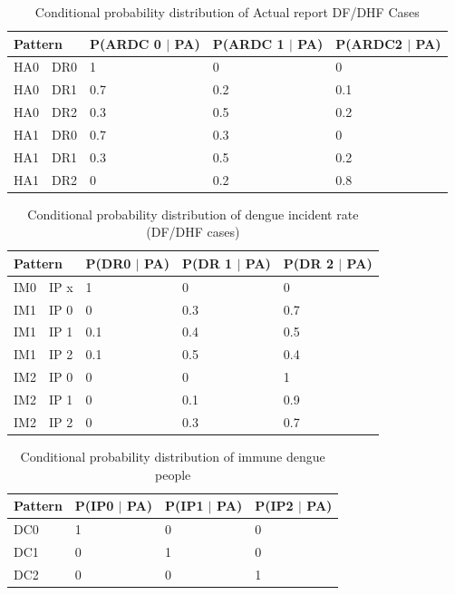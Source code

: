 \documentclass[review]{elsarticle}
\begin{document}
	\begin{table}[!htbp]
		\centering
		\normalsize
		\begin{tabular}{|l|l|l|l|l|}
			\hline
			\multicolumn{2}{|l|}{Pattern}  & P(ARDC 0 $\mid$ PA) & P(ARDC 1 $\mid$ PA) & P(ARDC2 $\mid$ PA)\\
			\hline
			HA0 & DR0 & 1 & 0 & 0\\
			\hline
			HA0 & DR1 & 0.7 & 0.2 & 0.1\\
			\hline
			HA0 & DR2 & 0.3 & 0.5 & 0.2\\
			\hline
			HA1 & DR0 & 0.7 & 0.3 & 0\\
			\hline
			HA1 & DR1 & 0.3 & 0.5 & 0.2\\
			\hline
			HA1 & DR2 & 0 & 0.2 & 0.8\\
			\hline
		\end{tabular}
		\caption{Conditional probability distribution of Actual report DF/DHF Cases}
	    \label{condition-dh}
	\end{table}
	
	\begin{table}[!htbp]
		\centering
		\normalsize
		\begin{tabular}{|l|l|l|l|l|}
			\hline
			\multicolumn{2}{|l|}{Pattern}   & P(DR0 $\mid$  PA) & P(DR 1 $\mid$  PA) & P(DR 2 $\mid$  PA)\\
			\hline
			IM0 & IP x & 1 & 0 & 0\\
			\hline
			IM1 & IP 0 & 0 & 0.3 & 0.7\\
			\hline
			IM1 & IP 1 & 0.1 & 0.4 & 0.5\\
			\hline
			IM1 & IP 2 & 0.1 & 0.5 & 0.4\\
			\hline
			IM2 & IP 0 & 0 & 0 & 1\\
			\hline
			IM2 & IP 1 & 0 & 0.1 & 0.9\\
			\hline
			IM2 & IP 2 & 0 & 0.3 & 0.7\\
			\hline
		\end{tabular}
		\caption{Conditional probability distribution of dengue incident rate (DF/DHF cases)}
		\label{condition-rdh}
	\end{table}
	
	\begin{table}[!htbp]
		\centering
		\normalsize
		\begin{tabular}{|l|l|l|l|}
			\hline
			Pattern & P(IP0 $\mid$ PA) & P(IP1 $\mid$ PA) & P(IP2 $\mid$ PA)\\
			\hline
			DC0 & 1 & 0 & 0\\
			\hline
			DC1 & 0 & 1 & 0\\
			\hline
			DC2 & 0 & 0 & 1\\
			\hline
		\end{tabular}
		\caption{Conditional probability distribution of immune dengue people}
		\label{condition-idp}
	\end{table}
	
\end{document}
